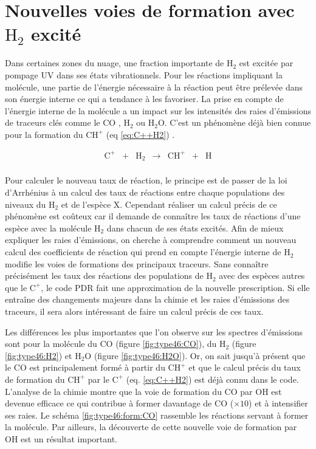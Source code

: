 \section{Nouvelles voies de formation avec $\mathrm{H}_2$ excité}

Dans certaines zones du nuage, une fraction importante de $\mathrm{H}_2$ est excitée par pompage UV dans ses états vibrationnels. Pour les réactions impliquant la molécule, une partie de l'énergie nécessaire à la réaction peut être prélevée dans son énergie interne ce qui a tendance à les favoriser. La prise en compte de l'énergie interne de la molécule a un impact sur les intensités des raies d'émissions de traceurs clés comme le $\mathrm{CO}$ \cite{COJoblin}, $\mathrm{H}_2$ ou $\mathrm{H}_2\mathrm{O}$. C'est un phénomène déjà bien connue pour la formation du $\mathrm{CH}^+$ (eq \ref{eq:C++H2}) \cite{Herraez, Zanchet}.

\begin{equation} \label{eq:C++H2}
    \begin{array}{lllclll}
        \mathrm{C}^+ & + &\mathrm{H}_2   & \rightarrow &\mathrm{CH}^+  & + & \mathrm{H} \\
    \end{array}
\end{equation}

Pour calculer le nouveau taux de réaction, le principe est de passer de la loi d'Arrhénius à un calcul des taux de réactions entre chaque populations des niveaux du $\mathrm{H}_2$ et de l'espèce $\mathrm{X}$. Cependant réaliser un calcul précis de ce phénomène est coûteux car il demande de connaître les taux de réactions d'une espèce avec la molécule $\mathrm{H}_2$ dans chacun de ses états excités. Afin de mieux expliquer les raies d'émissions, on cherche à comprendre comment un nouveau calcul des coefficients de réaction qui prend en compte l'énergie interne de $\mathrm{H}_2$ modifie les voies de formations des principaux traceurs. Sans connaître précisément les taux des réactions des populations de $\mathrm{H}_2$ avec 
des espèces autres que le $\mathrm{C}^+$, le code PDR fait une approximation de la nouvelle prescription. Si elle entraîne des changements majeurs dans la chimie et les raies d'émissions des traceurs, il sera alors intéressant de faire un calcul précis de ces taux. \newline 

Les différences les plus importantes que l'on observe sur les spectres d'émissions sont pour la molécule du $\mathrm{CO}$ (figure \ref{fig:type46:CO}), du $\mathrm{H}_2$ (figure \ref{fig:type46:H2}) et $\mathrm{H}_2\mathrm{O}$ (figure \ref{fig:type46:H2O}). Or, on sait jusqu'à présent que le $\mathrm{CO}$ est principalement formé à partir du $\mathrm{CH}^+$ et que le calcul précis du taux de formation du $\mathrm{CH}^+$ par le $\mathrm{C}^+$ (eq. \ref{eq:C++H2}) est déjà connu dans le code. L'analyse de la chimie montre que la voie de formation du $\mathrm{CO}$ par $\mathrm{OH}$ est devenue efficace ce qui contribue à former davantage de $\mathrm{CO}$ ($\times 10$) et à intensifier ses raies. Le schéma \ref{fig:type46:form:CO} rassemble les réactions servant à former la molécule. Par ailleurs, la découverte de cette nouvelle voie de formation par $\mathrm{OH}$ est un résultat important. 

